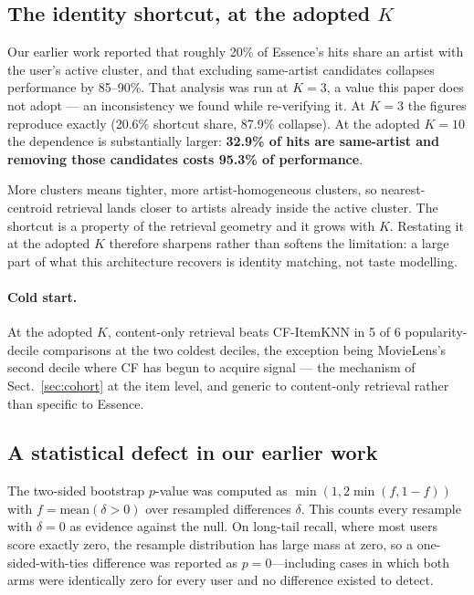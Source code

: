 \documentclass[runningheads,a4paper]{llncs}
\begin{document}
\subsection{The identity shortcut, at the adopted \texorpdfstring{$K$}{K}}\label{sec:shortcut}

Our earlier work reported that roughly 20\% of Essence's hits share an artist with the user's
active cluster, and that excluding same-artist candidates collapses performance by 85--90\%.
That analysis was run at $K = 3$, a value this paper does not adopt --- an inconsistency we
found while re-verifying it. At $K = 3$ the figures reproduce exactly (20.6\% shortcut share,
87.9\% collapse). At the adopted $K = 10$ the dependence is substantially larger:
\textbf{32.9\% of hits are same-artist and removing those candidates costs 95.3\% of
performance}.

More clusters means tighter, more artist-homogeneous clusters, so nearest-centroid retrieval
lands closer to artists already inside the active cluster. The shortcut is a property of the
retrieval geometry and it grows with $K$. Restating it at the adopted $K$ therefore sharpens
rather than softens the limitation: a large part of what this architecture recovers is
identity matching, not taste modelling.

\paragraph{Cold start.}\label{sec:cold} At the adopted $K$, content-only retrieval beats
CF-ItemKNN in 5 of 6 popularity-decile comparisons at the two coldest deciles, the exception
being MovieLens's second decile where CF has begun to acquire signal --- the mechanism of
Sect.~\ref{sec:cohort} at the item level, and generic to content-only retrieval rather than
specific to Essence.

\subsection{A statistical defect in our earlier work}\label{sec:bug}

The two-sided bootstrap $p$-value was computed as $\min(1, 2\min(f, 1-f))$ with
$f = \mathrm{mean}(\delta > 0)$ over resampled differences $\delta$. This counts every
resample with $\delta = 0$ as evidence against the null. On long-tail recall, where most
users score exactly zero, the resample distribution has large mass at zero, so a
one-sided-with-ties difference was reported as $p = 0$---including cases in which both arms
were identically zero for every user and no difference existed to detect.
\end{document}
